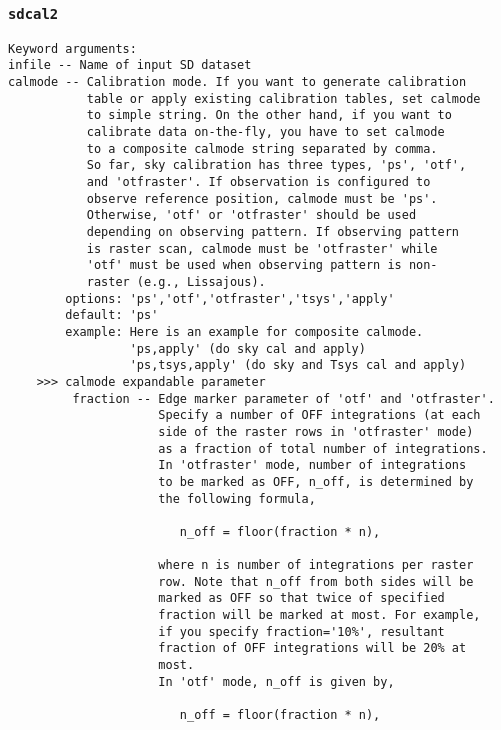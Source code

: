 \subsubsection{{\tt sdcal2}}
\label{section:sd.sdtasks.tasks.sdcal2}

\begin{verbatim}
Keyword arguments:
infile -- Name of input SD dataset
calmode -- Calibration mode. If you want to generate calibration 
           table or apply existing calibration tables, set calmode 
           to simple string. On the other hand, if you want to 
           calibrate data on-the-fly, you have to set calmode 
           to a composite calmode string separated by comma.
           So far, sky calibration has three types, 'ps', 'otf',
           and 'otfraster'. If observation is configured to 
           observe reference position, calmode must be 'ps'. 
           Otherwise, 'otf' or 'otfraster' should be used
           depending on observing pattern. If observing pattern
           is raster scan, calmode must be 'otfraster' while 
           'otf' must be used when observing pattern is non-
           raster (e.g., Lissajous).
        options: 'ps','otf','otfraster','tsys','apply'
        default: 'ps'
        example: Here is an example for composite calmode.
                 'ps,apply' (do sky cal and apply)
                 'ps,tsys,apply' (do sky and Tsys cal and apply)
    >>> calmode expandable parameter
         fraction -- Edge marker parameter of 'otf' and 'otfraster'.
                     Specify a number of OFF integrations (at each
                     side of the raster rows in 'otfraster' mode)
                     as a fraction of total number of integrations.
                     In 'otfraster' mode, number of integrations 
                     to be marked as OFF, n_off, is determined by 
                     the following formula,

                        n_off = floor(fraction * n),

                     where n is number of integrations per raster 
                     row. Note that n_off from both sides will be  
                     marked as OFF so that twice of specified 
                     fraction will be marked at most. For example, 
                     if you specify fraction='10%', resultant 
                     fraction of OFF integrations will be 20% at 
                     most.
                     In 'otf' mode, n_off is given by,

                        n_off = floor(fraction * n),
 

\end{verbatim}

